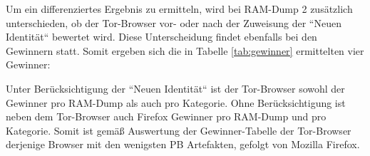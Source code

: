 Um ein differenziertes Ergebnis zu ermitteln, wird bei RAM-Dump 2 zusätzlich unterschieden, ob der Tor-Browser vor- oder nach der Zuweisung der ``Neuen Identität`` bewertet wird. 
Diese Unterscheidung findet ebenfalls bei den Gewinnern statt. Somit ergeben sich die in Tabelle \ref{tab:gewinner} ermittelten vier Gewinner:

\begin{table}[h!]
	\centering
	\caption{Ermittelte Gewinner gemäß Gewinner-Tabelle}
	\label{tab:gewinner}
\end{table}

Unter Berücksichtigung der ``Neuen Identität`` ist der Tor-Browser sowohl der Gewinner pro RAM-Dump als auch pro Kategorie.
Ohne Berücksichtigung ist neben dem Tor-Browser auch Firefox Gewinner pro RAM-Dump und pro Kategorie. Somit ist gemäß Auswertung der Gewinner-Tabelle der Tor-Browser derjenige Browser mit den wenigsten PB Artefakten, gefolgt von Mozilla Firefox.












